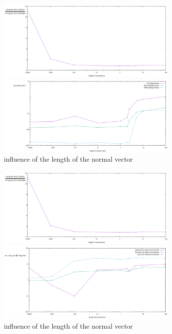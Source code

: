 \documentclass[11pt,a4paper,faculty=we,language=en,doctype=report]{cls/ugent-doc}
\begin{document}
\begin{figure}
	\centering
	\begin{minipage}{\textwidth}
		\includegraphics[width=0.8\textwidth]{figures/NormVsTime.pdf}
	\end{minipage}
	\begin{minipage}{\textwidth}
		\includegraphics[width=0.8\textwidth]{figures/NormVsSigmaTime.pdf}
	\end{minipage}
\caption{influence of the length of the normal vector}
\label{fig:norminfl}
\end{figure}
\begin{figure}
	\centering
	\begin{minipage}{\textwidth}
		\includegraphics[width=0.8\textwidth]{figures/NormVsTime.pdf}
	\end{minipage}
	\begin{minipage}{\textwidth}
		\includegraphics[width=0.8\textwidth]{figures/NormVsSigmaAZ.pdf}
	\end{minipage}
\caption{influence of the length of the normal vector}
\label{fig:norminfl2}
\end{figure}
\end{document}
